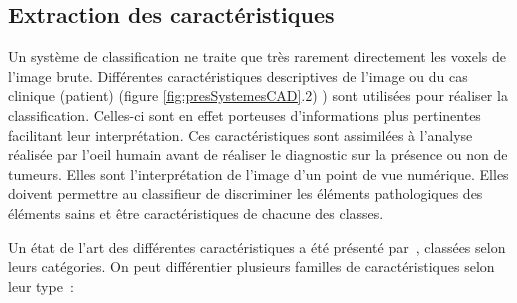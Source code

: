 	\subsection{Extraction des caractéristiques}

Un système de classification ne traite que très rarement directement les voxels de l’image brute. Différentes caractéristiques descriptives de l’image ou du cas clinique (patient) (figure \ref{fig:presSystemesCAD}.2) ) sont utilisées pour réaliser la classification. Celles-ci sont en effet porteuses d’informations plus pertinentes facilitant leur interprétation. Ces caractéristiques sont assimilées à l'analyse réalisée par l'oeil humain avant de réaliser le diagnostic sur la présence ou non de tumeurs. Elles sont l’interprétation de l’image d’un point de vue numérique. Elles doivent permettre au classifieur de discriminer les éléments pathologiques des éléments sains et être caractéristiques de chacune des classes. 

Un état de l'art des différentes caractéristiques a été présenté par~\cite{cheng2006approaches}, classées selon leurs catégories. On peut différentier plusieurs familles de caractéristiques selon leur type :

